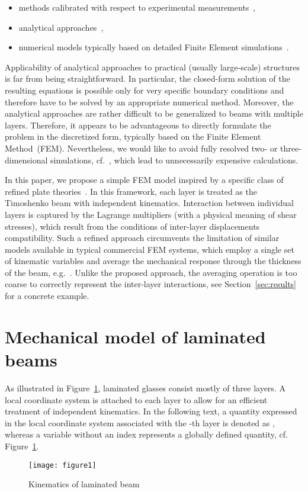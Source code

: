 \documentclass[times,a4paper,12pt]{elsarticle}
\begin{document}
\begin{itemize}
\item methods calibrated with respect to experimental
  measurements~\cite{Norville:1998:BSLG},
\item analytical
  approaches~\cite{Vallabhan:1993:ALG,Asik:2003:LGP,Asik:2005:MMB},
\item numerical models typically based on detailed Finite Element
  simulations~\cite{Duser:1999:AGBL,Ivanov:2006:AMO}.
\end{itemize} 

Applicability of analytical approaches to practical (usually
large-scale) structures is far from being straightforward. In
particular, the closed-form solution of the resulting equations is
possible only for very specific boundary conditions and therefore have
to be solved by an appropriate numerical method. Moreover, the
analytical approaches are rather difficult to be generalized to beams
with multiple layers. Therefore, it appears to be advantageous to
directly formulate the problem in the discretized form, typically
based on the Finite Element Method~(FEM). Nevertheless, we would like
to avoid fully resolved two- or three-dimensional simulations,
cf.~\cite{Duser:1999:AGBL,Ivanov:2006:AMO}, which lead to
unnecessarily expensive calculations.

In this paper, we propose a simple FEM model inspired by a specific
class of refined plate
theories~\cite{Mau:1973:RLP,Sejnoha:1996:MMU,Matous:1998:EBO}. In this
framework, each layer is treated as the Timoshenko beam with
independent kinematics. Interaction between individual layers is
captured by the Lagrange multipliers (with a physical meaning of shear
stresses), which result from the conditions of inter-layer
displacements compatibility. Such a refined approach circumvents the
limitation of similar models available in typical commercial FEM
systems, which employ a single set of kinematic variables and average
the mechanical response through the thickness of the beam,
e.g.~\cite{Bathe:1996:FEM}. Unlike the proposed approach, the
averaging operation is too coarse to correctly represent the
inter-layer interactions, see Section~\ref{sec:results} for a concrete
example.

\section{Mechanical model of laminated beams}\label{sec:formulation}
As illustrated in Figure~\ref{fig:lam_beam}, laminated glasses consist
mostly of three layers. A local coordinate system is attached to each
layer to allow for an efficient treatment of independent
kinematics. In the following text, a quantity  expressed in the
local coordinate system associated with the -th layer is denoted as
, whereas a variable without an index represents a
globally defined quantity, cf. Figure~\ref{fig:lam_beam}.
\begin{figure}[ht]
\centerline{\texttt{[image: figure1]} 
}\caption{Kinematics of laminated beam}
\label{fig:lam_beam}
\end{figure}
\end{document}
